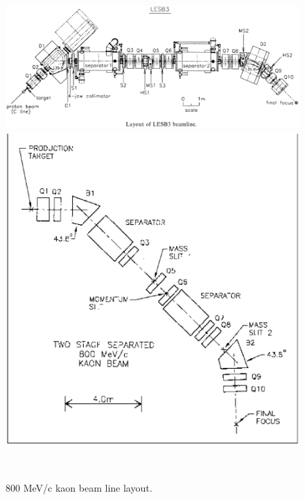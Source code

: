 \begin{figure}[H]
\centerline{\includegraphics[width=12cm]{FigLESB3Lay.eps}}

\centerline{\includegraphics[width=13cm]{FigC2-1.ps}}

~

\caption{\label{figC21}800 MeV/c kaon beam line layout.}
\end{figure}

\vfill


